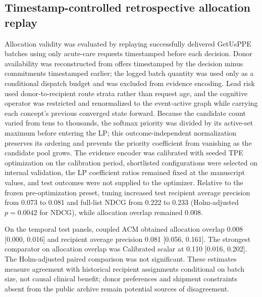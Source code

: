 \subsection{Timestamp-controlled retrospective allocation replay}

Allocation validity was evaluated by replaying successfully delivered GetUsPPE batches using only acute-care requests timestamped before each decision. Donor availability was reconstructed from offers timestamped by the decision minus commitments timestamped earlier; the logged batch quantity was used only as a conditional dispatch budget and was excluded from evidence encoding. Lead risk used donor-to-recipient route strata rather than request age, and the cognitive operator was restricted and renormalized to the event-active graph while carrying each concept's previous converged state forward. Because the candidate count varied from tens to thousands, the softmax priority was divided by its active-set maximum before entering the LP; this outcome-independent normalization preserves its ordering and prevents the priority coefficient from vanishing as the candidate pool grows. The evidence encoder was calibrated with seeded TPE optimization on the calibration period, shortlisted configurations were selected on internal validation, the LP coefficient ratios remained fixed at the manuscript values, and test outcomes were not supplied to the optimizer. Relative to the frozen pre-optimization preset, tuning increased test recipient average precision from 0.073 to 0.081 and full-list NDCG from 0.222 to 0.233 (Holm-adjusted $p=0.0042$ for NDCG), while allocation overlap remained 0.008.

On the temporal test panels, coupled ACM obtained allocation overlap 0.008 [0.000, 0.016] and recipient average precision 0.081 [0.056, 0.161]. The strongest comparator on allocation overlap was Calibrated scalar at 0.110 [0.016, 0.202]. The Holm-adjusted paired comparison was not significant. These estimates measure agreement with historical recipient assignments conditional on batch size, not causal clinical benefit; donor preferences and shipment constraints absent from the public archive remain potential sources of disagreement.
